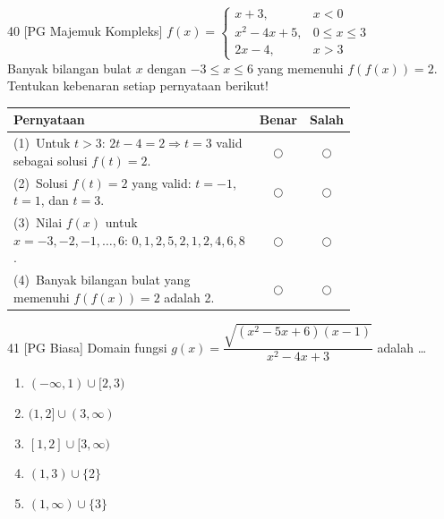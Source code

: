 \documentclass[11pt]{article}
\newenvironment{pil}{%
  \begin{enumerate}[label=(\alph*),leftmargin=*,itemsep=1pt,topsep=3pt]}%
  {\end{enumerate}}
\begin{document}
\begin{soal}{40 \normalfont\small[PG Majemuk Kompleks]}
$f(x)=\begin{cases}x+3, & x<0\\ x^2-4x+5, & 0\leq x\leq3\\ 2x-4, & x>3\end{cases}$\\[0.5em]
Banyak bilangan bulat $x$ dengan $-3\leq x\leq6$ yang memenuhi $f(f(x))=2$.
Tentukan kebenaran setiap pernyataan berikut!

\par\smallskip
{\renewcommand{\arraystretch}{1.4}%
\begin{tabular}{@{}p{0.76\linewidth}cc@{}}
\hline\textbf{Pernyataan}&\textbf{Benar}&\textbf{Salah}\\\hline
(1)~Untuk $t>3$: $2t-4=2\Rightarrow t=3$ valid sebagai solusi $f(t)=2$.&$\bigcirc$&$\bigcirc$\\
(2)~Solusi $f(t)=2$ yang valid: $t=-1$, $t=1$, dan $t=3$.&$\bigcirc$&$\bigcirc$\\
(3)~Nilai $f(x)$ untuk $x=-3,-2,-1,\ldots,6$: $0,1,2,5,2,1,2,4,6,8$.&$\bigcirc$&$\bigcirc$\\
(4)~Banyak bilangan bulat yang memenuhi $f(f(x))=2$ adalah 2.&$\bigcirc$&$\bigcirc$\\\hline
\end{tabular}}
\end{soal}


\begin{soal}{41 \normalfont\small[PG Biasa]}
Domain fungsi $g(x)=\dfrac{\sqrt{(x^2-5x+6)(x-1)}}{x^2-4x+3}$ adalah \ldots
\begin{pil}
  \item $(-\infty,1)\cup[2,3)$
  \item $(1,2]\cup(3,\infty)$
  \item $[1,2]\cup[3,\infty)$
  \item $(1,3)\cup\{2\}$
  \item $(1,\infty)\cup\{3\}$
\end{pil}
\end{soal}
\end{document}
